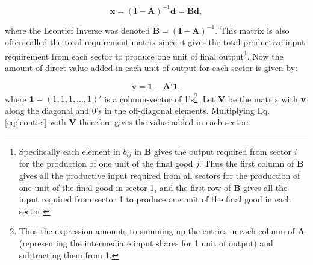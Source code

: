 \documentclass[a4paper]{article}
\begin{document}
\begin{equation} \label{eq:leontief}
\textbf{x} = (\textbf{I}-\textbf{A})^{-1} \textbf{d} = \textbf{B}\textbf{d},
\end{equation}

where the Leontief Inverse was denoted $\textbf{B} = (\textbf{I}-\textbf{A})^{-1}$. This matrix is also often called the total requirement matrix since it gives the total productive input requirement from each sector to produce one unit of final output\footnote{Specifically each element in $b_{ij}$ in \textbf{B} gives the output required from sector $i$ for the production  of one unit of the final good $j$. Thus the first column of \textbf{B} gives all the productive input required from all sectors for the production of one unit of the final good in sector 1, and the first row of \textbf{B} gives all the input required from sector 1 to produce one unit of the final good in each sector.}. Now the amount of direct value added in each unit of output for each sector is given by:

\begin{equation}
\textbf{v} = \textbf{1} - \textbf{A}'\textbf{1},
\end{equation}
where $\textbf{1} = (1, 1, 1, ..., 1)'$ is a column-vector of 1's\footnote{Thus the expression amounts to summing up the entries in each column of \textbf{A} (representing the intermediate input shares for 1 unit of output) and subtracting them from 1.}. Let \textbf{V} be the matrix with \textbf{v} along the diagonal and 0's in the off-diagonal elements. Multiplying Eq. \ref{eq:leontief} with $\textbf{V}$ therefore gives the value added in each sector:
\end{document}
